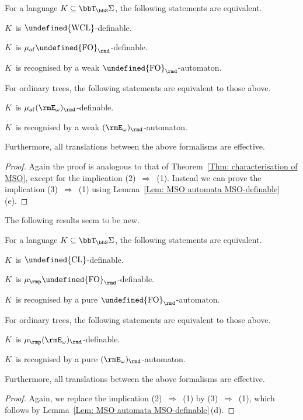 \documentclass[10pt, fleqn]{scrartcl}
\makeatletter
\newcommand\m@thsm@ller[2]{\mbox{\relscale{0.91}$\m@th#1#2$}}
\let\smaller\undefined
\DeclareRobustCommand\smaller[1]{\relax\ifmmode{\mathpalette\m@thsm@ller{#1}}\else{\relscale{0.91}#1}\fi}
\newcommand*{\CL}{\smaller{\mathrm{CL}}}
\newcommand*{\WCL}{\smaller{\mathrm{WCL}}}
\newcommand*{\FO}{\smaller{\mathrm{FO}}}
\newcommand*{\muaf}{\mu_{\mathrm{af}}}
\newcommand*{\mup}{\mu_\rmp}
\newcommand*{\?}{\kern .08em}
\makeatother
\begin{document}
\begin{Thm}\label{Thm: characterisation of WCL}
For a language $K \subseteq \bbT_\bbS\Sigma$, the following statements are equivalent.
\begin{enum1}
\item $K$~is $\WCL$-definable.
\item $K$~is $\muaf\FO_\rmd$-definable.
\item $K$~is recognised by a weak $\FO_\rmd$-automaton.
\end{enum1}
For ordinary trees, the following statements are equivalent to those above.
\begin{enum1}[start=4]
\item $K$~is $\muaf(\rmE_\omega)_\rmd$-definable.
\item $K$~is recognised by a weak $(\rmE_\omega)_\rmd$-automaton.
\end{enum1}
Furthermore, all translations between the above formalisms are effective.
\end{Thm}
\begin{proof}
Again the proof is analogous to that of Theorem~\ref{Thm: characterisation of MSO}, except
for the implication (2)~$\Rightarrow$~(1).
Instead we can prove the implication (3)~$\Rightarrow$~(1) using
Lemma~\ref{Lem: MSO automata MSO-definable}\,(e).
\end{proof}

The following results seem to be new.
\begin{Thm}\label{Thm: characterisation of CL}
For a language $K \subseteq \bbT_\bbS\Sigma$, the following statements are equivalent.
\begin{enum1}
\item $K$~is $\CL$-definable.
\item $K$~is $\mup\FO_\rmd$-definable.
\item $K$~is recognised by a pure $\FO_\rmd$-automaton.
\end{enum1}
For ordinary trees, the following statements are equivalent to those above.
\begin{enum1}[start=4]
\item $K$~is $\mup(\rmE_\omega)_\rmd$-definable.
\item $K$~is recognised by a pure $(\rmE_\omega)_\rmd$-automaton.
\end{enum1}
Furthermore, all translations between the above formalisms are effective.
\end{Thm}
\begin{proof}
Again, we replace the implication (2)~$\Rightarrow$~(1) by (3)~$\Rightarrow$~(1),
which follows by Lemma~\ref{Lem: MSO automata MSO-definable}\,(d).
\end{proof}
\end{document}
